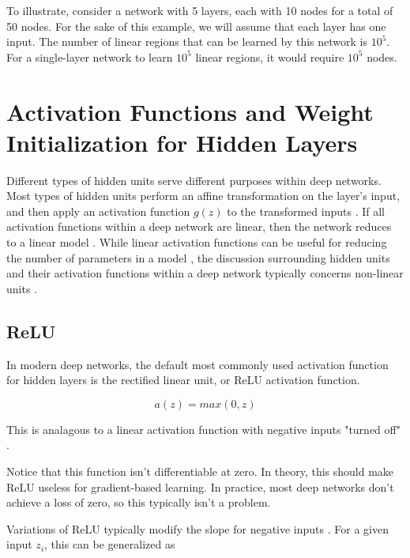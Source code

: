 \documentclass{article}
\begin{document}
To illustrate, consider a network with 5 layers, each with 10 nodes for a total of 50 nodes. For the sake of this example, we will assume that each layer has one input. The number of linear regions that can be learned by this network is \(10^5\). For a single-layer network to learn \(10^5\) linear regions, it would require \(10^5\) nodes. 

\section{Activation Functions and Weight Initialization for Hidden Layers} %

Different types of hidden units serve different purposes within deep networks. Most types of hidden units perform an affine  transformation on the layer's input, and then apply an activation function \(g(z)\) to the transformed inputs \cite{Goodfellow-et-al-2016}. If all activation functions within a deep network are linear, then the network reduces to a linear model \cite{pml1book}. While linear activation functions can be useful for reducing the number of parameters in a model , the discussion surrounding hidden units and their activation functions within a deep network typically concerns non-linear units \cite{Goodfellow-et-al-2016}. 

\subsection{ReLU}

In modern deep networks, the default most commonly used activation function for hidden layers is the rectified linear unit, or ReLU activation function.

\begin{equation}
    a(z) = max(0, z)
    \label{ReLU-activation}
\end{equation}

This is analagous to a linear activation function with negative inputs "turned off" \cite{pml1book}. 

Notice that this function isn't differentiable at zero. In theory, this should make ReLU useless for gradient-based learning. In practice, most deep networks don't achieve a loss of zero, so this typically isn't a problem.

Variations of ReLU typically modify the slope for negative inputs \cite{Goodfellow-et-al-2016}. For a given input \(z_i\), this can be generalized as
\end{document}
